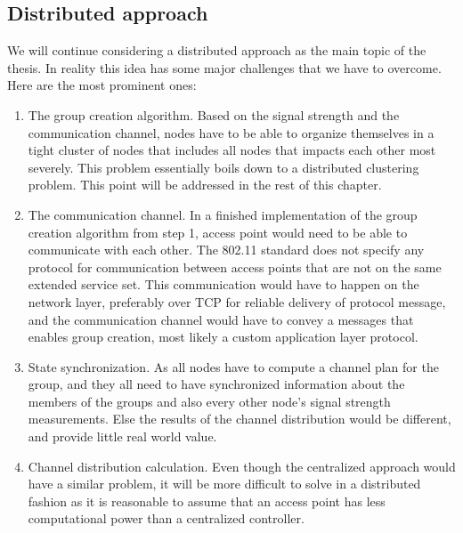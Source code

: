\subsection{Distributed approach}
We will continue considering a distributed approach as the main topic of the thesis. In reality this idea has some major challenges that we have to overcome. Here are the most prominent ones: 
\begin{enumerate}
	\item The group creation algorithm. Based on the signal strength and the communication channel, nodes have to be able to organize themselves in a tight cluster of nodes that
		includes all nodes that impacts each other most severely. This problem essentially boils down to a distributed clustering problem. This point will be addressed in the rest of this chapter.
	\item The communication channel. In a finished implementation of the group creation algorithm from step 1, access point would need to be able to communicate with each other.
		The 802.11 standard does not specify any protocol for communication between access points that are not on the same extended service set.
		This communication would have to happen on the network layer, preferably over TCP for reliable delivery of protocol message, and the communication channel would have to convey a messages that enables group creation, most likely a custom application layer protocol. 
	\item State synchronization. As all nodes have to compute a channel plan for the group, and they all need to have synchronized information about the members of the groups
		and also every other node's signal strength measurements. Else the results of the channel distribution would be different, and provide little real world value. 
	\item Channel distribution calculation. Even though the centralized approach would have a similar problem, it will be more difficult to solve in a distributed fashion as 
		it is reasonable to assume that an access point has less computational power than a centralized controller.
\end{enumerate}


